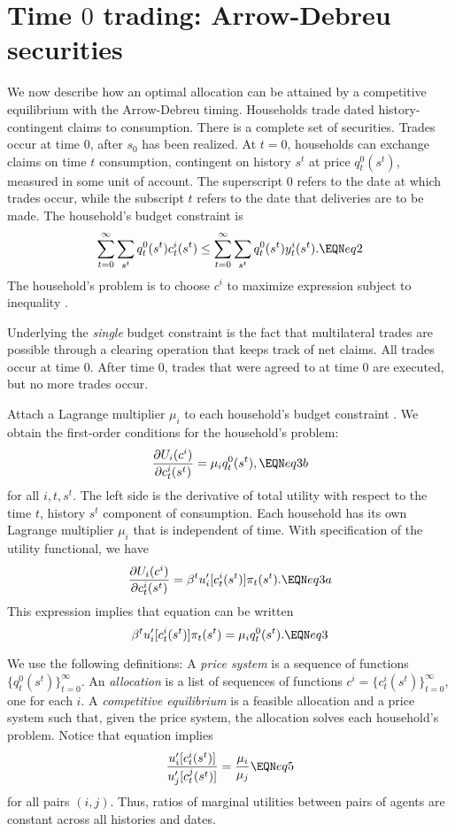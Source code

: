 \section{Time $0$ trading: Arrow-Debreu securities}
We now describe how an optimal allocation can be attained by a
competitive equilibrium with the Arrow-Debreu timing. Households
trade dated history-contingent claims to consumption. There is a
complete set of securities. Trades occur at time $0$, after $s_0$
has been realized. At $t=0$, households can exchange claims on
time $t$ consumption, contingent on history $s^t$ at price
$q_t^0(s^t)$, measured in some unit of account. The superscript $0$ refers to the date at which
trades occur, while the subscript $t$ refers to the date that
deliveries are to be made.  The household's budget constraint is
$$ \sum_{t=0}^\infty \sum_{s^t}  q_t^0(s^t)  c_t^i(s^t)   \leq
   \sum_{t=0}^\infty \sum_{s^t}  q_t^0(s^t) y_t^i(s^t).   \EQN eq2 $$
The household's problem is to choose  $c^i$
to maximize expression  subject to inequality  .

Underlying the {\it single\/}  budget constraint  is the
fact that multilateral   trades are possible through a clearing
operation that keeps track of net claims.
All trades occur at time $0$.  After time $0$, trades that
were agreed to at time $0$ are executed, but no more trades occur.


Attach a Lagrange multiplier $\mu_i$ to each household's  budget constraint  .
We obtain the
first-order conditions for the household's problem:
$$  {\partial U_i(c^i) \over \partial c_t^i(s^t)} = \mu_i q_t^0(s^t), \EQN eq3b $$
for all $i, t, s^t$.
The left side is the derivative of total utility with respect to
the time $t$, history $s^t$ component of consumption.  Each
household has its own Lagrange multiplier $\mu_i$ that is independent of time. With specification  of the utility functional,
we have
$$ {\partial U_i(c^i) \over \partial c_t^i(s^t)} =   \beta^t
 u'_i[c_t^i(s^t)] \pi_t(s^t) .  \EQN eq3a $$
This expression  implies that equation  can be written
$$ \beta^t u'_i[c_t^i(s^t)] \pi_t(s^t) = \mu_i q_t^0(s^t). \EQN eq3 $$


We use the following  definitions:
\medskip
{}   A {\it price system} is a sequence of
functions $\{q_t^0(s^t)\}_{t=0}^\infty$.  An {\it allocation} is
a list of sequences of functions $c^i=\{c_t^i(s^t)\}_{t=0}^\infty$,
 one for each $i$.
\medskip
{} A {\it competitive equilibrium} is
a feasible allocation and a price system such that, given
the price system,  the allocation solves
each household's problem.
\medskip
Notice that equation  implies
$$ {u'_i[c_t^i(s^t)] \over
 u'_j[c_t^j(s^t)] }
 = {\mu_i\over \mu_j}          \EQN eq5 $$
for all pairs $(i,j)$.
Thus, ratios of marginal utilities between pairs of agents are
constant across all histories and dates.



